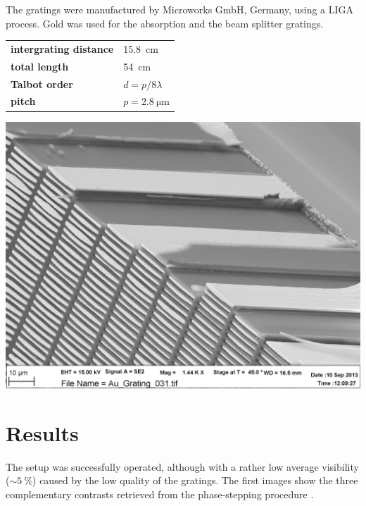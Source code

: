 \documentclass[a0,portrait]{a0poster}
\newenvironment{spacedcenter}{
    \vspace{2cm}\begin{center}}
        {\end{center}
    \vspace{2cm}\par}
\begin{document}
\begin{multicols}{2}
The gratings were manufactured by Microworks GmbH, Germany, using a LIGA
process. Gold was used for the absorption and the beam splitter gratings.
\begin{spacedcenter}
\begin{tabular}{ll}
    \textbf{intergrating distance} & \SI{15.8}{\centi\metre} \\
    \textbf{total length} & \SI{54}{\centi\metre} \\
    \textbf{Talbot order} & $d = p / 8 \lambda$ \\
        \textbf{pitch} & $p = \SI{2.8}{\micro\m}$ \\
\end{tabular}
\end{spacedcenter}
\begin{center}
    \includegraphics[width=0.7\linewidth]{Au_Grating_031.pdf}
\end{center}
\columnbreak



\section*{Results}

The setup was successfully operated, although with a rather low average
visibility ($\sim \SI{5}{\percent}$) caused by the low quality of the
gratings. The first images show the three complementary contrasts retrieved
from the phase-stepping procedure \cite{Weitkamp2005}. 


\end{multicols}
\end{document}
